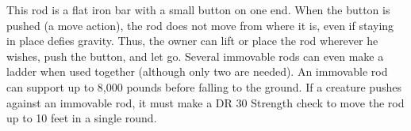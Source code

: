 
 This rod is a flat iron bar with a small button on one end. When the button is pushed (a move action), the rod does not move from where it is, even if staying in place defies gravity. Thus, the owner can lift or place the rod wherever he wishes, push the button, and let go. Several immovable rods can even make a ladder when used together (although only two are needed). An immovable rod can support up to 8,000 pounds before falling to the ground. If a creature pushes against an immovable rod, it must make a DR 30 Strength check to move the rod up to 10 feet in a single round.



